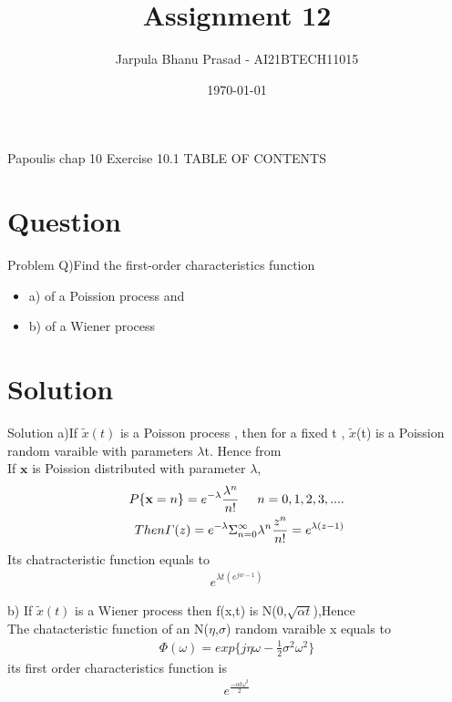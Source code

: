 \documentclass{beamer}
\title{Assignment 12}
\author{Jarpula Bhanu Prasad - AI21BTECH11015}
\date{\today}
\begin{document}
\begin{frame}
    \titlepage 
\end{frame}

\logo{}


\begin{frame}{Papoulis chap 10 Exercise 10.1}
TABLE OF CONTENTS
    \tableofcontents
\end{frame}


\section{Question}
\begin{frame}{Problem}
Q)Find the first-order characteristics function 
\begin{itemize}
    \item a) of a Poission process and 
    \item b) of a Wiener process
\end{itemize}
\end{frame}

\section{Solution}
\begin{frame}{Solution}
   a)If $\tilde{x}(t)$ is a Poisson process , then for a fixed t , $\tilde{x}$(t) is a Poission random varaible with parameters $\lambda$t.  Hence from \\ 
   If $\textbf{x}$ is Poission distributed with parameter $\lambda$,
   \begin{align}
       P\{\textbf{x}=n\} = e^{-\lambda} \frac{\lambda^n}{n!} \hspace{5mm} n=0,1,2,3,.... \\
       Then \varGamma(z) = e^{-\lambda} \Sigma^{\infty}_{n=0} \lambda^n \frac{z^n}{n!} = e^{\lambda(z-1)}
   \end{align}
   Its chatracteristic function equals to 
   \begin{align}
       e^{\lambda t(e^{jw-1})}
   \end{align}
\end{frame}

\begin{frame}
   b) If $\tilde{x}(t)$ is a Wiener process then f(x,t) is N(0,$\sqrt{\alpha t}$),Hence \\
   The chatacteristic function of an N($\eta$,$\sigma$) random varaible x equals to
    \begin{align}
        \Phi(\omega) = exp\{j\eta \omega - \frac{1}{2} \sigma^2 \omega^2\}
    \end{align}
    its first order characteristics function is 
    \begin{align}
        e^{\frac{-\alpha t \omega^2}{2}}
    \end{align}

\end{frame}
\end{document}
